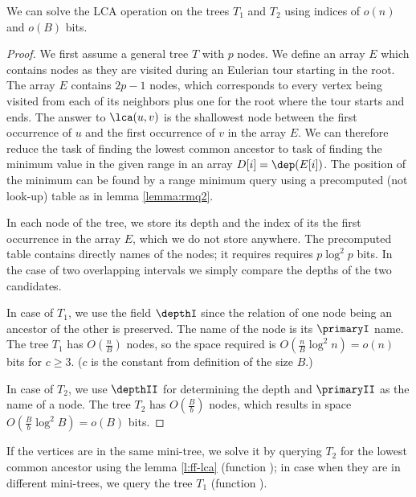 \begin{lemma}\label{l:ff-lca}
	We can solve the LCA operation on the trees $T_1$ and $T_2$ using indices of $o(n)$ and $o(B)$ bits.
\end{lemma}
\begin{proof}
	We first assume a general tree $T$ with $p$ nodes.
	We define an array $E$ which contains nodes as they are visited during an Eulerian tour starting in the root.
	The array $E$ contains $2p - 1$ nodes, which corresponds to every vertex being visited from each of its neighbors plus one for the root where the tour starts and ends.
	The answer to $\lca(u, v)$ is the shallowest node between the first occurrence of $u$ and the first occurrence of $v$ in the array $E$.
	We can therefore reduce the task of finding the lowest common ancestor to task of finding the minimum value in the given range in an array $D[i] = \dep(E[i])$.
	The position of the minimum can be found by a range minimum query using a precomputed (not look-up) table as in lemma \ref{lemma:rmq2}.
	
	In each node of the tree, we store its depth and the index of its the first occurrence in the array $E$, which we do not store anywhere.
	The precomputed table contains directly names of the nodes; it requires requires $p \log^2 p$ bits.
	In the case of two overlapping intervals we simply compare the depths of the two candidates.
	
	In case of $T_1$, we use the field $\depthI$ since the relation of one node being an ancestor of the other is preserved.
	The name of the node is its $\primaryI$ name.
	The tree $T_1$ has $O(\frac{n}{B})$ nodes, so the space required is $O(\frac{n}{B} \log^2 n) = o(n)$ bits for $c \ge 3$.
	($c$ is the constant from definition of the size $B$.)
	
	In case of $T_2$, we use $\depthII$ for determining the depth and $\primaryII$ as the name of a node.
	The tree $T_2$ has $O(\frac{B}{b})$ nodes, which results in space $O(\frac{B}{b} \log^2 B) = o(B)$ bits.
\end{proof}

If the vertices are in the same mini-tree, we solve it by querying $T_2$ for the lowest common ancestor using the lemma \ref{l:ff-lca} (function \lcaI); in case when they are in different mini-trees, we query the tree $T_1$ (function \lcaII).


